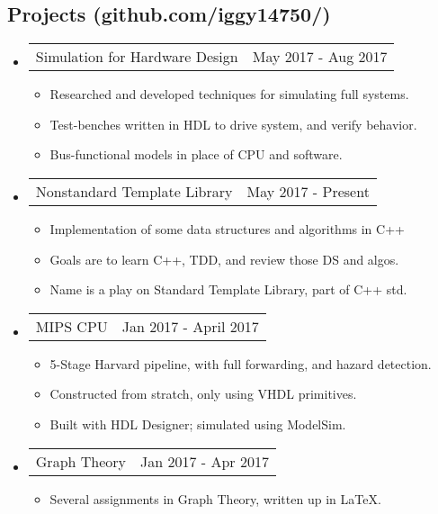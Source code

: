 \documentclass[18pt]{article}
\makeatletter
\providecommand{\tightlist}{
    \setlength{\itemsep}{0pt}\setlength{\parskip}{0pt}
}
\providecommand{\datetable}[2]{
    \begin{tabular*}{\textwidth}{r @{\extracolsep{\fill}} l}
        #1 & #2
    \end{tabular*}
}
\makeatother
\begin{document}
  \subsection*{Projects (github.com/iggy14750/)}\label{projects}
    \begin{itemize}\tightlist
        
      \item \datetable{Simulation for Hardware Design}{May 2017 - Aug 2017}
      \begin{itemize}\tightlist
        \item Researched and developed techniques for simulating full systems.
        \item Test-benches written in HDL to drive system, and verify behavior.
        \item Bus-functional models in place of CPU and software.
      \end{itemize}
        
      \item \datetable{Nonstandard Template Library}{May 2017 - Present}
      \begin{itemize}\tightlist
        \item Implementation of some data structures and algorithms in C++
        \item Goals are to learn C++, TDD, and review those DS and algos.
        \item Name is a play on Standard Template Library, part of C++ std.
      \end{itemize}
          
      \item \datetable{MIPS CPU}{Jan 2017 - April 2017}
      \begin{itemize}\tightlist
        \item 5-Stage Harvard pipeline, with full forwarding, and hazard detection.
        \item Constructed from stratch, only using VHDL primitives.
        \item Built with HDL Designer; simulated using ModelSim.
      \end{itemize}
      
      \item \datetable{Graph Theory}{Jan 2017 - Apr 2017}
      \begin{itemize}\tightlist
        \item Several assignments in Graph Theory, written up in \LaTeX.
      \end{itemize}
      

\end{itemize}
\end{document}
